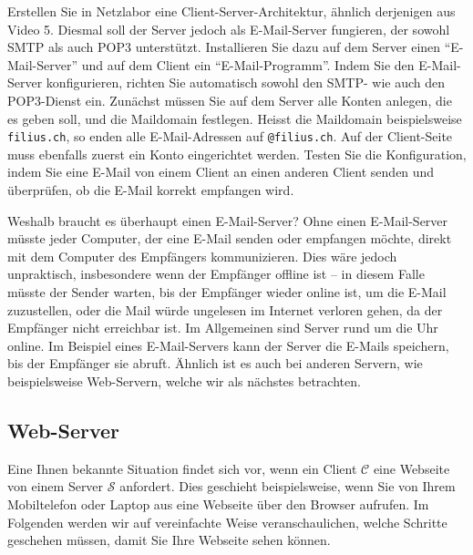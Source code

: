 \begin{mychallenge}
	Erstellen Sie in Netzlabor eine Client-Server-Architektur, ähnlich derjenigen aus Video 5. Diesmal soll der Server jedoch als E-Mail-Server fungieren, der sowohl \gls{SMTP} als auch \gls{POP3} unterstützt. Installieren Sie dazu auf dem Server einen \enquote{E-Mail-Server} und auf dem Client ein \enquote{E-Mail-Programm}. Indem Sie den E-Mail-Server konfigurieren, richten Sie automatisch sowohl den \gls{SMTP}- wie auch den \gls{POP3}-Dienst ein.
	Zunächst müssen Sie auf dem Server alle Konten anlegen, die es geben soll, und die Maildomain festlegen. Heisst die Maildomain beispielsweise \texttt{filius.ch}, so enden alle E-Mail-Adressen auf \texttt{@filius.ch}. Auf der Client-Seite muss ebenfalls zuerst ein Konto eingerichtet werden. Testen Sie die Konfiguration, indem Sie eine E-Mail von einem Client an einen anderen Client senden und überprüfen, ob die E-Mail korrekt empfangen wird.
\end{mychallenge}

Weshalb braucht es überhaupt einen E-Mail-Server? Ohne einen E-Mail-Server müsste jeder Computer, der eine E-Mail senden oder empfangen möchte, direkt mit dem Computer des Empfängers kommunizieren. Dies wäre jedoch unpraktisch, insbesondere wenn der Empfänger offline ist -- in diesem Falle müsste der Sender warten, bis der Empfänger wieder online ist, um die E-Mail zuzustellen, oder die Mail würde ungelesen im Internet verloren gehen, da der Empfänger nicht erreichbar ist. Im Allgemeinen sind Server rund um die Uhr online. Im Beispiel eines E-Mail-Servers kann der Server die E-Mails speichern, bis der Empfänger sie abruft. Ähnlich ist es auch bei anderen Servern, wie beispielsweise Web-Servern, welche wir als nächstes betrachten.

\subsection{Web-Server}
Eine Ihnen bekannte Situation findet sich vor, wenn ein Client $\mathcal{C}$ eine Webseite von einem Server $\mathcal{S}$ anfordert. Dies geschieht beispielsweise, wenn Sie von Ihrem Mobiltelefon oder Laptop aus eine Webseite über den Browser aufrufen. Im Folgenden werden wir auf vereinfachte Weise veranschaulichen, welche Schritte geschehen müssen, damit Sie Ihre Webseite sehen können.


